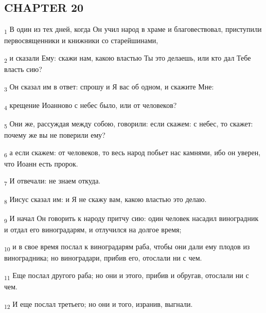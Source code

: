 \subsection{CHAPTER 20}
\begin{tcolorbox}
\textsubscript{1} В один из тех дней, когда Он учил народ в храме и благовествовал, приступили первосвященники и книжники со старейшинами,
\end{tcolorbox}
\begin{tcolorbox}
\textsubscript{2} и сказали Ему: скажи нам, какою властью Ты это делаешь, или кто дал Тебе власть сию?
\end{tcolorbox}
\begin{tcolorbox}
\textsubscript{3} Он сказал им в ответ: спрошу и Я вас об одном, и скажите Мне:
\end{tcolorbox}
\begin{tcolorbox}
\textsubscript{4} крещение Иоанново с небес было, или от человеков?
\end{tcolorbox}
\begin{tcolorbox}
\textsubscript{5} Они же, рассуждая между собою, говорили: если скажем: с небес, то скажет: почему же вы не поверили ему?
\end{tcolorbox}
\begin{tcolorbox}
\textsubscript{6} а если скажем: от человеков, то весь народ побьет нас камнями, ибо он уверен, что Иоанн есть пророк.
\end{tcolorbox}
\begin{tcolorbox}
\textsubscript{7} И отвечали: не знаем откуда.
\end{tcolorbox}
\begin{tcolorbox}
\textsubscript{8} Иисус сказал им: и Я не скажу вам, какою властью это делаю.
\end{tcolorbox}
\begin{tcolorbox}
\textsubscript{9} И начал Он говорить к народу притчу сию: один человек насадил виноградник и отдал его виноградарям, и отлучился на долгое время;
\end{tcolorbox}
\begin{tcolorbox}
\textsubscript{10} и в свое время послал к виноградарям раба, чтобы они дали ему плодов из виноградника; но виноградари, прибив его, отослали ни с чем.
\end{tcolorbox}
\begin{tcolorbox}
\textsubscript{11} Еще послал другого раба; но они и этого, прибив и обругав, отослали ни с чем.
\end{tcolorbox}
\begin{tcolorbox}
\textsubscript{12} И еще послал третьего; но они и того, изранив, выгнали.
\end{tcolorbox}
